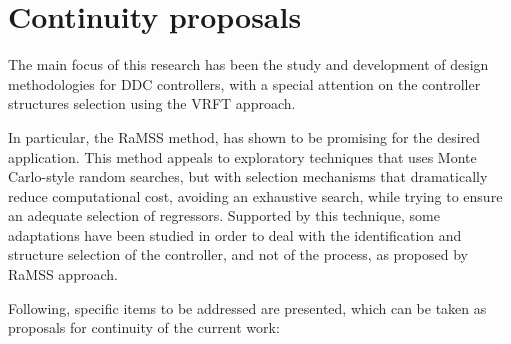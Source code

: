 \section{Continuity proposals}\label{sec:Prop_cont}


The main focus of this research has been the study and development of design methodologies for DDC controllers, with a special attention on the controller structures selection using the VRFT approach.

In particular, the RaMSS method, has shown to be promising for the desired application. This method appeals to exploratory techniques that uses Monte Carlo-style random searches, but with selection mechanisms that dramatically reduce computational cost, avoiding an exhaustive search, while trying to ensure an adequate selection of regressors.
%
Supported by this technique, some adaptations have been studied in order to deal with the identification and structure selection of the controller, and not of the process, as proposed by RaMSS approach.

Following, specific items to be addressed are presented, which can be taken as proposals for continuity of the current work:



